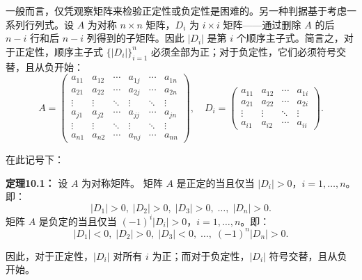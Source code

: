 \begin{translation}
一般而言，仅凭观察矩阵来检验正定性或负定性是困难的。另一种判据基于考虑一系列行列式。设 $A$ 为对称 $n \times n$ 矩阵，$D_i$ 为 $i \times i$ 矩阵——通过删除 $A$ 的后 $n-i$ 行和后 $n-i$ 列得到的子矩阵。因此 $|D_i|$ 是第 $i$ 个顺序主子式。简言之，对于正定性，顺序主子式 $\{|D_i|\}_{i=1}^n$ 必须全部为正；对于负定性，它们必须符号交替，且从负开始：
\[
A =
\begin{pmatrix}
a_{11} & a_{12} & \cdots & a_{1j} & \cdots & a_{1n} \\
a_{21} & a_{22} & \cdots & a_{2j} & \cdots & a_{2n} \\
\vdots & \vdots & \ddots & \vdots & \ddots & \vdots \\
a_{j1} & a_{j2} & \cdots & a_{jj} & \cdots & a_{jn} \\
\vdots & \vdots & \ddots & \vdots & \ddots & \vdots \\
a_{n1} & a_{n2} & \cdots & a_{nj} & \cdots & a_{nn}
\end{pmatrix},
\quad
D_i =
\begin{pmatrix}
a_{11} & a_{12} & \cdots & a_{1i} \\
a_{21} & a_{22} & \cdots & a_{2i} \\
\vdots & \vdots & \ddots & \vdots \\
a_{i1} & a_{i2} & \cdots & a_{ii}
\end{pmatrix}.
\]

在此记号下：

\textbf{定理10.1：} 设 $A$ 为对称矩阵。
矩阵 $A$ 是正定的当且仅当 $|D_i| > 0$，$i = 1,\ldots,n$。即：
\[
|D_1| > 0,\; |D_2| > 0,\; |D_3| > 0,\; \ldots,\; |D_n| > 0.
\]
矩阵 $A$ 是负定的当且仅当 $(-1)^i|D_i| > 0$，$i = 1,\ldots,n$。即：
\[
|D_1| < 0,\; |D_2| > 0,\; |D_3| < 0,\; \ldots,\; (-1)^n|D_n| > 0.
\]

因此，对于正定性，$|D_i|$ 对所有 $i$ 为正；而对于负定性，$|D_i|$ 符号交替，且从负开始。
\end{translation}

